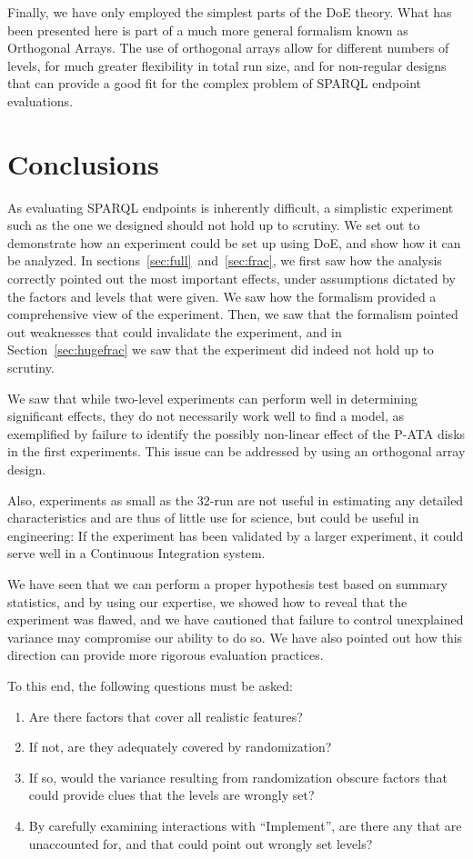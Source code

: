 \documentclass{llncs}
\begin{document}
Finally, we have only employed the simplest parts of the DoE theory.
What has been presented here is part of a much more general formalism
known as Orthogonal Arrays. The use of orthogonal arrays allow for
different numbers of levels, for much greater flexibility in total run
size, and for non-regular designs that can provide a good fit for the
complex problem of SPARQL endpoint evaluations.

\section{Conclusions}

As evaluating SPARQL endpoints is inherently difficult, a simplistic
experiment such as the one we designed should not hold up to
scrutiny. We set out to demonstrate how an experiment could be set up
using DoE, and show how it can be analyzed. In
sections~\ref{sec:full}~and~\ref{sec:frac}, we first saw how the
analysis correctly pointed out the most important effects, under
assumptions dictated by the factors and levels that were given. We saw
how the formalism provided a comprehensive view of the
experiment. Then, we saw that the formalism pointed out weaknesses
that could invalidate the experiment, and in
Section~\ref{sec:hugefrac} we saw that the experiment did indeed not
hold up to scrutiny.

We saw that while two-level experiments can perform well in determining
significant effects, they do not necessarily work well to find a
model, as exemplified by failure to identify the possibly non-linear
effect of the P-ATA disks in the first experiments. This issue can be
addressed by using an orthogonal array design.

Also, experiments as small as the 32-run are not useful in estimating
any detailed characteristics and are thus of little use for science,
but could be useful in engineering: If the experiment has been
validated by a larger experiment, it could serve well in a Continuous
Integration system.

We have seen that we can perform a proper hypothesis test based on
summary statistics, and by using our expertise, we showed how to reveal
that the experiment was flawed, and we have cautioned that failure to
control unexplained variance may compromise our ability to do so. We
have also pointed out how this direction can provide more rigorous
evaluation practices.

To this end, the following questions must be asked:
\begin{enumerate}
\item Are there factors that cover all realistic features?
\item If not, are they adequately covered by randomization?
\item If so, would the variance resulting from randomization obscure
  factors that could provide clues that the levels are wrongly set?
\item By carefully examining interactions with ``Implement'', are
  there any that are unaccounted for, and that could point out wrongly
  set levels?
\end{enumerate}
\end{document}
